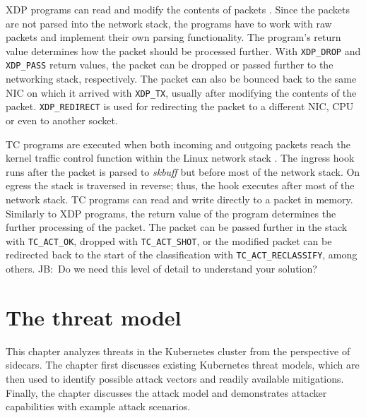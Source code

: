 \documentclass[english, 12pt, a4paper, sci, utf8, a-2b, online]{aaltothesis}
\newcommand{\mycomment}[3]{\textcolor{#1}{#2:~#3}}
\newcommand{\jb}[1]{\noindent\mycomment{aaltoRed}{JB}{#1}}
\begin{document}

XDP programs can read and modify the contents of packets \cite{vieira2020fast}.
Since the packets are not parsed into the network stack, the programs have to work with raw packets and implement their own parsing functionality.
The program's return value determines how the packet should be processed further.
With \texttt{XDP\_DROP} and \texttt{XDP\_PASS} return values, the packet can be dropped or passed further to the networking stack, respectively.
The packet can also be bounced back to the same NIC on which it arrived with \texttt{XDP\_TX}, usually after modifying the contents of the packet.
\texttt{XDP\_REDIRECT} is used for redirecting the packet to a different NIC, CPU or even to another socket.

TC programs are executed when both incoming and outgoing packets reach the kernel traffic control function within the Linux network stack \cite{vieira2020fast}.
The ingress hook runs after the packet is parsed to \emph{skbuff} but before most of the network stack.
On egress the stack is traversed in reverse; thus, the hook executes after most of the network stack.
TC programs can read and write directly to a packet in memory.
Similarly to XDP programs, the return value of the program determines the further processing of the packet.
The packet can be passed further in the stack with \texttt{TC\_ACT\_OK}, dropped with \texttt{TC\_ACT\_SHOT}, or the modified packet can be redirected back to the start of the classification with \texttt{TC\_ACT\_RECLASSIFY}, among others.
\jb{Do we need this level of detail to understand your solution?}

\clearpage

\section{The threat model} \label{sec:threats}

This chapter analyzes threats in the Kubernetes cluster from the perspective of sidecars.
The chapter first discusses existing Kubernetes threat models, which are then used to identify possible attack vectors and readily available mitigations.
Finally, the chapter discusses the attack model and demonstrates attacker capabilities with example attack scenarios.
\end{document}
